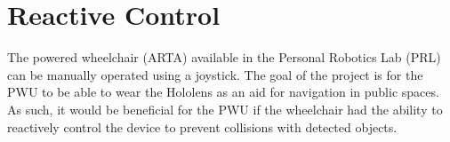 \section{Reactive Control}
The powered wheelchair (ARTA) available in the Personal Robotics Lab (PRL) can be manually operated using a joystick. The goal of the project is for the PWU to be able to wear the Hololens as an aid for navigation in public spaces. As such, it would be beneficial for the PWU if the wheelchair had the ability to reactively control the device to prevent collisions with detected objects.
